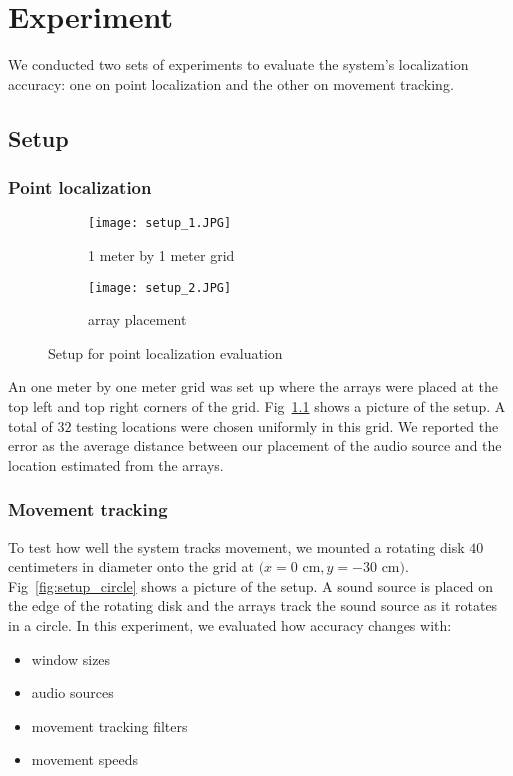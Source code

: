 \chapter{Experiment}
We conducted two sets of experiments to evaluate the system's localization accuracy: one on point localization and the other on movement tracking. 

\section{Setup}
\subsection{Point localization}

\begin{figure}[]
  \centering
  \begin{subfigure}[]{.48\textwidth}
    \texttt{[image: setup\_1.JPG]}
    \caption{1 meter by 1 meter grid}
  \end{subfigure}
  \begin{subfigure}[]{.48\textwidth}
    \texttt{[image: setup\_2.JPG]}
    \caption{array placement}
  \end{subfigure}
  \caption{Setup for point localization evaluation}
  \label{fig:setup_point}
\end{figure}

An one meter by one meter grid was set up where the arrays were placed at the top left and top right corners of the grid. Fig~\ref{fig:setup_point} shows a picture of the setup. A total of $32$ testing locations were chosen uniformly in this grid. We reported the error as the average distance between our placement of the audio source and the location estimated from the arrays.

\subsection{Movement tracking}
To test how well the system tracks movement, we mounted a rotating disk $40$ centimeters in diameter onto the grid at $(x=0$ cm$, y=-30$ cm$)$. Fig~\ref{fig:setup_circle} shows a picture of the setup. A sound source is placed on the edge of the rotating disk and the arrays track the sound source as it rotates in a circle. In this experiment, we evaluated how accuracy changes with:
\begin{itemize}
\item window sizes
\item audio sources
\item movement tracking filters
\item movement speeds
\end{itemize}


